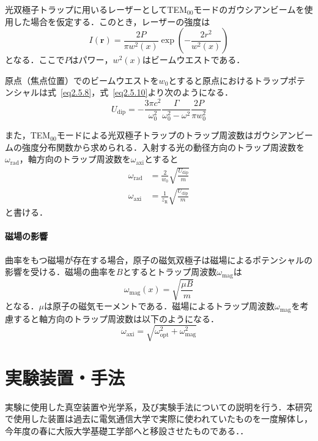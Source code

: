\documentclass[11pt,a4j,notitlepage]{jreport}
\newcommand{\eq}[1]{式~\eqref{#1}}	%
\begin{document}
光双極子トラップに用いるレーザーとしてTEM$_{00}$モードのガウシアンビームを使用した場合を仮定する．このとき，レーザーの強度は
\begin{equation}
	I(\bm{r})=\frac{2 P}{\pi w^{2}(x)} \exp \left(-\frac{2 r^{2}}{w^{2}(x)}\right)
	\label{eq2.5.10}
\end{equation}
となる．ここで$P$はパワー，$w^{2}(x)$はビームウエストである．

原点（焦点位置）でのビームウエストを$w_{0}$とすると原点におけるトラップポテンシャルは\eq{eq2.5.8}，\eq{eq2.5.10}より次のようになる．
\begin{equation}
	U_{\mathrm{dip}}=-\frac{3 \pi c^{2}}{\omega_{0}^{2}} \frac{\Gamma}{\omega_{0}^{2}-\omega^{2}} \frac{2 P}{\pi w_{0}^{2}}
	\label{eq2.5.11}
\end{equation}

また，TEM$_{00}$モードによる光双極子トラップのトラップ周波数はガウシアンビームの強度分布関数から求められる．入射する光の動径方向のトラップ周波数を$\omega_{\mathrm{rad}}$，軸方向のトラップ周波数を$\omega_{\mathrm{axi}}$とすると
\begin{align}
	\omega_{\mathrm{rad}}
	& = \frac{2}{w_{0}} \sqrt{\frac{U_{\mathrm{dip}}}{m}}
	\label{eq2.5.12} \\
	\omega_{\mathrm{axi}}
	& = \frac{1}{z_{\mathrm{R}}} \sqrt{\frac{U_{\mathrm{dip}}}{m}}
	\label{eq2.5.13}
\end{align}
と書ける．

\subsubsection{磁場の影響}
曲率をもつ磁場が存在する場合，原子の磁気双極子は磁場によるポテンシャルの影響を受ける．磁場の曲率を$B$とするとトラップ周波数$\omega_{\operatorname{mag}}$は
\begin{equation}
	\omega_{\operatorname{mag}}(x)=\sqrt{\frac{\mu B}{m}}
	\label{eq2.5.14}
\end{equation}
となる．$\mu$は原子の磁気モーメントである．磁場によるトラップ周波数$\omega_{\mathrm{mag}}$を考慮すると軸方向のトラップ周波数は以下のようになる．
\begin{equation}
	\omega_{\mathrm{axi}}=\sqrt{\omega_{\mathrm{opt}}^{2}+\omega_{\mathrm{mag}}^{2}}
	\label{eq2.5.15}
\end{equation}

\chapter{実験装置・手法}
実験に使用した真空装置や光学系，及び実験手法についての説明を行う．本研究で使用した装置は過去に電気通信大学で実際に使われていたものを一度解体し，今年度の春に大阪大学基礎工学部へと移設させたものである．\cite{InaD}\cite{YoshiJun}\cite{Miyato}\cite{Waseem}．
\end{document}
